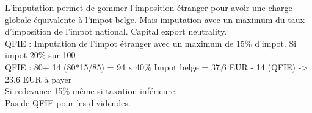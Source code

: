 \documentclass{book}
\begin{document}
L'imputation permet de gommer l'imposition étranger pour avoir une charge globale équivalente à l'impot belge. Mais imputation avec un maximum du taux d'imposition de l'impot national. Capital export neutrality.\\

QFIE : Imputation de l'impot étranger avec un maximum de 15\% d'impot. Si impot 20\% sur 100 \\

QFIE : 80+ 14 (80*15/85) = 94 x 40\% Impot belge = 37,6 EUR - 14 (QFIE) -> 23,6 EUR à payer  \\

Si redevance 15\% même si taxation inférieure.\\

Pas de QFIE pour les dividendes.\\





\nocite{*}

\end{document}
